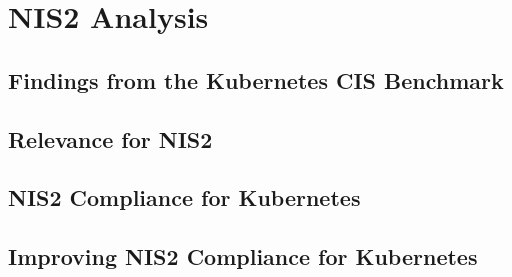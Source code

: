 %
%

\pagebreak
\section{NIS2 Analysis}

\onehalfspacing

\subsection{Findings from the Kubernetes CIS Benchmark}

\subsection{Relevance for NIS2}

\subsection{NIS2 Compliance for Kubernetes}

\subsection{Improving NIS2 Compliance for Kubernetes}
